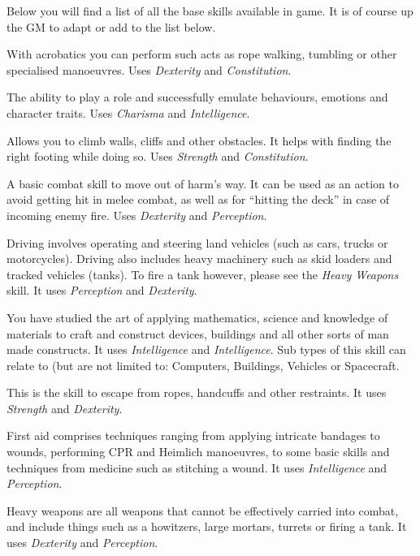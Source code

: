Below you will find a list of all the base skills available in game. It is of
course up the GM to adapt or add to the list below.

\begin{description}
   With acrobatics you can perform such acts as rope
  walking, tumbling or other specialised manoeuvres. Uses \emph{Dexterity} and
  \emph{Constitution}.

   The ability to play a role and successfully emulate behaviours,
  emotions and character traits. Uses \emph{Charisma} and \emph{Intelligence}.

   Allows you to climb walls, cliffs and other obstacles. It
  helps with finding the right footing while doing so. Uses \emph{Strength}
  and \emph{Constitution}.

   A basic combat skill to move out of harm's way. It can be
  used as an action to avoid getting hit in melee combat, as well as for
  ``hitting the deck'' in case of incoming enemy fire. Uses \emph{Dexterity}
  and \emph{Perception}.

   Driving involves operating and steering land vehicles (such as
  cars, trucks or motorcycles). Driving also includes heavy machinery such as
  skid loaders and tracked vehicles (tanks). To fire a tank however, please see
  the \emph{Heavy Weapons} skill. It uses \emph{Perception} and \emph{Dexterity}.

   You have studied the art of applying
  mathematics, science and knowledge of materials to craft and construct
  devices, buildings and all other sorts of man made constructs. It uses
  \emph{Intelligence} and \emph{Intelligence}. Sub types of this skill can
  relate to (but are not limited to: Computers, Buildings, Vehicles or
  Spacecraft.

   This is the skill to escape from ropes, handcuffs and
  other restraints. It uses \emph{Strength} and \emph{Dexterity}.

   First aid comprises techniques ranging from applying
  intricate bandages to wounds, performing CPR and Heimlich manoeuvres, to some
  basic skills and techniques from medicine such as stitching a wound. It uses
  \emph{Intelligence} and \emph{Perception}.

   Heavy weapons are all weapons that cannot be effectively
  carried into combat, and include things such as a howitzers, large mortars,
  turrets or firing a tank. It uses \emph{Dexterity} and \emph{Perception}.


\end{description}
